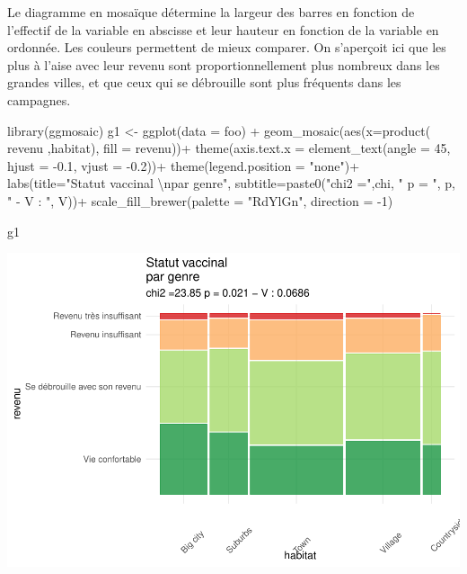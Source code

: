 \documentclass[
]{book}
\newenvironment{Shaded}{\begin{snugshade}}{\end{snugshade}}
\newcommand{\AttributeTok}[1]{\textcolor[rgb]{0.77,0.63,0.00}{#1}}
\newcommand{\DecValTok}[1]{\textcolor[rgb]{0.00,0.00,0.81}{#1}}
\newcommand{\FloatTok}[1]{\textcolor[rgb]{0.00,0.00,0.81}{#1}}
\newcommand{\FunctionTok}[1]{\textcolor[rgb]{0.00,0.00,0.00}{#1}}
\newcommand{\NormalTok}[1]{#1}
\newcommand{\OtherTok}[1]{\textcolor[rgb]{0.56,0.35,0.01}{#1}}
\newcommand{\SpecialCharTok}[1]{\textcolor[rgb]{0.00,0.00,0.00}{#1}}
\newcommand{\StringTok}[1]{\textcolor[rgb]{0.31,0.60,0.02}{#1}}
\begin{document}
Le diagramme en mosaïque détermine la largeur des barres en fonction de l'effectif de la variable en abscisse et leur hauteur en fonction de la variable en ordonnée. Les couleurs permettent de mieux comparer.
On s'aperçoit ici que les plus à l'aise avec leur revenu sont proportionnellement plus nombreux dans les grandes villes, et que ceux qui se débrouille sont plus fréquents dans les campagnes.

\begin{Shaded}
\begin{Highlighting}[]
\FunctionTok{library}\NormalTok{(ggmosaic)}
\NormalTok{g1 }\OtherTok{\textless{}{-}} \FunctionTok{ggplot}\NormalTok{(}\AttributeTok{data =}\NormalTok{ foo) }\SpecialCharTok{+}
  \FunctionTok{geom\_mosaic}\NormalTok{(}\FunctionTok{aes}\NormalTok{(}\AttributeTok{x=}\FunctionTok{product}\NormalTok{( revenu ,habitat), }\AttributeTok{fill =}\NormalTok{ revenu))}\SpecialCharTok{+}  
  \FunctionTok{theme}\NormalTok{(}\AttributeTok{axis.text.x =} \FunctionTok{element\_text}\NormalTok{(}\AttributeTok{angle =} \DecValTok{45}\NormalTok{, }\AttributeTok{hjust =} \SpecialCharTok{{-}}\FloatTok{0.1}\NormalTok{, }\AttributeTok{vjust =} \SpecialCharTok{{-}}\FloatTok{0.2}\NormalTok{))}\SpecialCharTok{+} 
  \FunctionTok{theme}\NormalTok{(}\AttributeTok{legend.position =} \StringTok{"none"}\NormalTok{)}\SpecialCharTok{+}
  \FunctionTok{labs}\NormalTok{(}\AttributeTok{title=}\StringTok{"Statut vaccinal }\SpecialCharTok{\textbackslash{}n}\StringTok{par genre"}\NormalTok{, }
       \AttributeTok{subtitle=}\FunctionTok{paste0}\NormalTok{(}\StringTok{"chi2 ="}\NormalTok{,chi, }\StringTok{" p = "}\NormalTok{, p, }\StringTok{" {-} V : "}\NormalTok{, V))}\SpecialCharTok{+}    
  \FunctionTok{scale\_fill\_brewer}\NormalTok{(}\AttributeTok{palette =} \StringTok{"RdYlGn"}\NormalTok{, }\AttributeTok{direction =} \SpecialCharTok{{-}}\DecValTok{1}\NormalTok{) }

\NormalTok{g1}
\end{Highlighting}
\end{Shaded}

\includegraphics{bookdown-demo_files/figure-latex/0428-1.pdf}
\end{document}
